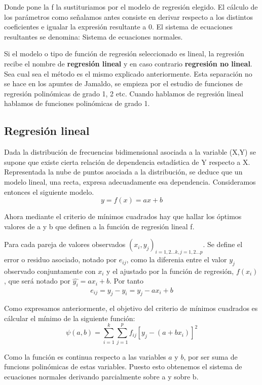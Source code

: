 \documentclass{article}
\begin{document}
	 Donde pone la f la sustituriamos por el modelo de regresión elegido. El cálculo de los parámetros como señalamos antes consiste en derivar respecto a los distintos coeficientes e igualar la expresión resultante a 0. El sistema de ecuaciones resultantes se denomina: Sistema de ecuaciones normales.
	\vspace{2mm}
	
	
	Si el modelo o tipo de función de regresión seleccionado es lineal, la regresión recibe el nombre de \textbf{regresión lineal} y en caso contrario \textbf{regresión no lineal}. Sea cual sea el método es el mismo explicado anteriormente. Esta separación no se hace en los apuntes de Jamaldo, se empieza por el estudio de funciones de regresión polinómicas de grado 1, 2 etc. Cuando hablamos de regresión lineal hablamos de funciones polinómicas de grado 1.
	
	
	\subsection{Regresión lineal}
	
	Dada la distribución de frecuencias bidimensional asociada a la variable (X,Y) se supone que existe cierta relación de dependencia estadística de Y respecto a X. Representada la nube de puntos asociada a la distribución, se deduce que un modelo lineal, una recta, expresa adecuadamente esa dependencia. Consideramos entonces el siguiente modelo.
	$$ y = f(x) = ax + b $$
	
	Ahora mediante el criterio de mínimos cuadrados hay que hallar los óptimos valores de a y b que definen a la función de regresión lineal f.
	
	Para cada pareja de valores observados $(x_i,y_j)_{i=1,2...k, j=1,2...p}$. Se define el error o residuo asociado, notado por $e_{ij}$, como la diferenia entre el valor $y_j$ observado conjuntamente con $x_i$ y el ajustado por la función de regresión, $f(x_i)$, que será notado por $\hat{y_i} = ax_i +b$.
	Por tanto $$e_{ij} = y_j - \hat{y_i} = y_j - ax_i + b $$
	
	Como expresamos anteriormente, el objetivo del criterio de mínimos cuadrados es cálcular el mínimo de la siguiente función: 
	$$\psi (a,b) = \sum_{i=1}^k \sum_{j=1}^p f_{ij} [ y_j - (a+bx_i)]^2 $$
	
	Como la función es continua respecto a las variables $a$ y $b$, por ser suma de funcions polinómicas de estas variables. Puesto esto obtenemos el sistema de ecuaciones normales derivando parcialmente sobre a y sobre b.
	
\end{document}
